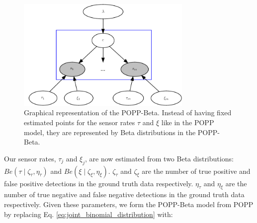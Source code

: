 \begin{figure}[t!]
	\centering
	\includegraphics[width=0.75\textwidth]{./figures/popb-pics.pdf}
	\caption{Graphical representation of the POPP-Beta. Instead of having fixed estimated points for the sensor rates $\tau$ and $\xi$ like in the POPP model, they are represented by Beta distributions in the POPP-Beta.}
	\label{fig:gm_popb}
	\vspace{-20pt}
\end{figure}


Our sensor rates, $\tau_j$ and $\xi_j$, are now estimated from two Beta distributions: $Be(\tau \mid \zeta_{\tau}, \eta_{\tau})$ and $Be(\xi \mid \zeta_{\xi}, \eta_{\xi})$.
% 
$\zeta_{\tau}$ and $\zeta_{\xi}$ are the number of true positive and false positive detections in the ground truth data respectively.
% 
$\eta_{\tau}$ and $\eta_{\xi}$ are the number of true negative and false  negative detections in the ground truth data respectively. 
% 
Given these parameters, we form the POPP-Beta model from POPP by replacing Eq. \ref{eq:joint_binomial_distribution} with:  

